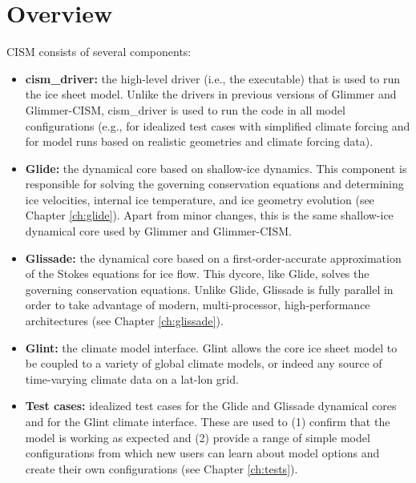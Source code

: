 \section{Overview}
%
CISM consists of several components:
%
\begin{itemize}

\item {\bf cism\_driver:} the high-level driver (i.e., the executable) that 
is used to run the ice sheet model. Unlike the drivers in previous versions of Glimmer and Glimmer-CISM, 
cism\_driver is used to run the code in all model configurations 
(e.g., for idealized test cases with simplified climate forcing and for model runs 
based on realistic geometries and climate forcing data).  

\item {\bf Glide:} the dynamical core based on shallow-ice dynamics. 
This component is responsible for solving the governing conservation equations and 
determining ice velocities, internal ice temperature, 
and ice geometry evolution (see Chapter \ref{ch:glide}). 
Apart from minor changes, this is the same shallow-ice dynamical core 
used by Glimmer and Glimmer-CISM.

\item {\bf Glissade:} the dynamical core based on a first-order-accurate approximation
of the Stokes equations for ice flow.  This dycore, like Glide, solves the governing conservation equations. 
Unlike Glide, Glissade is fully parallel in order to take advantage of modern, multi-processor, high-performance architectures 
(see Chapter \ref{ch:glissade}).

\item {\bf Glint:} the climate model interface. Glint allows the core ice sheet model to be coupled to a variety of 
global climate models, or indeed any source of time-varying climate data on a lat-lon grid. 

\item {\bf Test cases:} idealized test cases for the Glide and Glissade dynamical cores 
and for the Glint climate interface. These are used to (1) confirm that the model 
is working as expected and (2) provide a range of simple model configurations 
from which new users can learn about model options and 
create their own configurations (see Chapter \ref{ch:tests}). 


\end{itemize}

